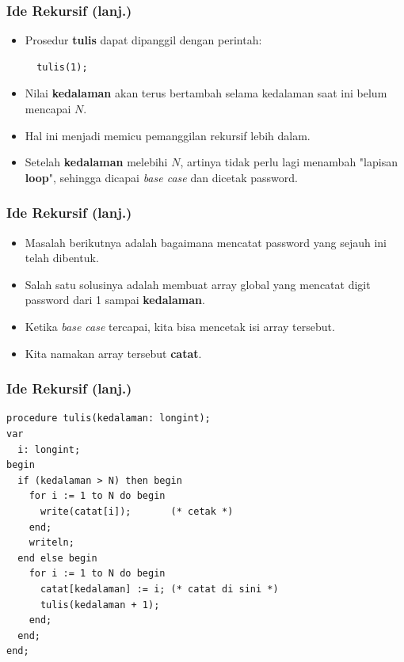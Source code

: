 \begin{frame}[fragile]
\frametitle{Ide Rekursif (lanj.)}
\begin{itemize}
  \item Prosedur \textbf{tulis} dapat dipanggil dengan perintah:
  \begin{lstlisting}
  tulis(1);
  \end{lstlisting}
  
  \item Nilai \textbf{kedalaman} akan terus bertambah selama kedalaman saat ini belum mencapai $N$. 
  \item Hal ini menjadi memicu pemanggilan rekursif lebih dalam.
  \item Setelah \textbf{kedalaman} melebihi $N$, artinya tidak perlu lagi menambah "lapisan \textbf{loop}", sehingga dicapai \textit{base case} dan dicetak password. 
\end{itemize}
\end{frame}

\begin{frame}[fragile]
\frametitle{Ide Rekursif (lanj.)}
\begin{itemize}
  \item Masalah berikutnya adalah bagaimana mencatat password yang sejauh ini telah dibentuk.
  \item Salah satu solusinya adalah membuat array global yang mencatat digit password dari 1 sampai \textbf{kedalaman}.
  \item Ketika \textit{base case} tercapai, kita bisa mencetak isi array tersebut.
  \item Kita namakan array tersebut \textbf{catat}.
\end{itemize}
\end{frame}

\begin{frame}[fragile]
\frametitle{Ide Rekursif (lanj.)}
\begin{lstlisting}
procedure tulis(kedalaman: longint);
var
  i: longint;
begin
  if (kedalaman > N) then begin
    for i := 1 to N do begin 
      write(catat[i]);       (* cetak *)
    end;
    writeln;
  end else begin
    for i := 1 to N do begin
      catat[kedalaman] := i; (* catat di sini *)
      tulis(kedalaman + 1);
    end;
  end;
end;
\end{lstlisting}
\end{frame}

